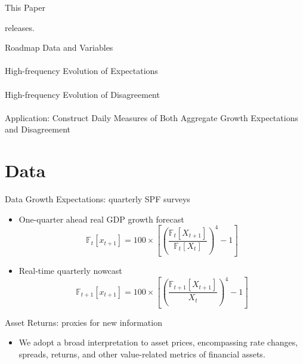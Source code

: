 \documentclass[UTF8, 10pt]{beamer}
\begin{document}
\begin{CJK*}{UTF8}{gbsn}
\begin{frame}{This Paper}
\begin{itemize}
releases.
	\end{itemize}
\end{frame}
\begin{frame}{Roadmap}
	Data and Variables
	\\ \ \\
	High-frequency Evolution of Expectations
	\\ \ \\
	High-frequency Evolution of Disagreement
	\\ \ \\
	Application: Construct Daily Measures of Both Aggregate Growth Expectations and Disagreement
\end{frame}

\section{Data}
\begin{frame}{Data}
	Growth Expectations: quarterly SPF surveys
	\begin{itemize}
		\item One-quarter ahead real GDP growth \alert{forecast}
			$$
			\mathbb{F}_{t}\left[x_{t+1}\right] = 100 \times
		    \left[
		    (\frac{\mathbb{F}_{t}\left[X_{t+1}\right]}{\mathbb{F}_{t}\left[X_{t}\right]})^4-1
		    \right]
			$$
		\item Real-time quarterly \alert{nowcast}
			$$
			\mathbb{F}_{t+1}\left[x_{t+1}\right] = 100 \times
		    \left[
		    (\frac{\mathbb{F}_{t+1}\left[X_{t+1}\right]}{X_{t}})^4-1
		    \right]
			$$
	\end{itemize}
	Asset Returns: proxies for new information
	\begin{itemize}
		\item We adopt a \alert{broad interpretation} to asset prices, encompassing rate changes, spreads,
returns, and other value-related metrics of financial assets.
	\end{itemize}
\end{frame}


\end{CJK*}
\end{document}

